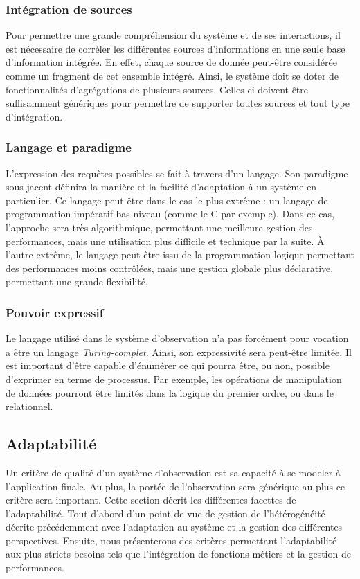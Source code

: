 \subsubsection{Intégration de sources}
Pour permettre une grande compréhension du système et de ses interactions, il est nécessaire de corréler les différentes sources d'informations en une seule base d'information intégrée. En effet, chaque source de donnée peut-être considérée comme un fragment de cet ensemble intégré. Ainsi, le système doit se doter de fonctionnalités d'agrégations de plusieurs sources. Celles-ci doivent être suffisamment génériques pour permettre de supporter toutes sources et tout type d'intégration.

\subsubsection{Langage et paradigme}
L'expression des requêtes possibles se fait à travers d'un langage. Son paradigme sous-jacent définira la manière et la facilité d'adaptation à un système en particulier. Ce langage peut être dans le cas le plus extrême : un langage de programmation impératif bas niveau (comme le C par exemple). Dans ce cas, l'approche sera très algorithmique, permettant une meilleure gestion des performances, mais une utilisation plus difficile et technique par la suite. À l'autre extrême, le langage peut être issu de la programmation logique permettant des performances moins contrôlées, mais une gestion globale plus déclarative, permettant une grande flexibilité.

\subsubsection{Pouvoir expressif}
Le langage utilisé dans le système d'observation n'a pas forcément pour vocation a être un langage \textit{Turing-complet}. Ainsi, son expressivité sera peut-être limitée. Il est important d'être capable d'énumérer ce qui pourra être, ou non, possible d'exprimer en terme de processus. Par exemple, les opérations de manipulation de données pourront être limités dans la logique du premier ordre, ou dans le relationnel.

\subsection{Adaptabilité}
Un critère de qualité d'un système d'observation est sa capacité à se modeler à l'application finale. Au plus, la portée de l'observation sera générique au plus ce critère sera important. Cette section décrit les différentes facettes de l'adaptabilité. Tout d'abord d'un point de vue de gestion de l'hétérogénéité décrite précédemment avec l'adaptation au système et la gestion des différentes perspectives. Ensuite, nous présenterons des critères permettant l'adaptabilité aux plus stricts besoins tels que l'intégration de fonctions métiers et la gestion de performances.


